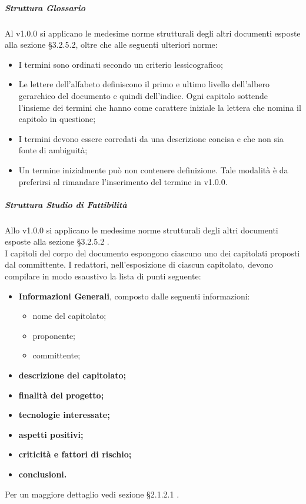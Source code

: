                 \subparagraph{Struttura Glossario}
                    Al  v1.0.0 si applicano le medesime norme strutturali degli altri documenti esposte alla sezione §3.2.5.2, oltre che alle seguenti ulteriori norme:\\
                    \begin{itemize}
                        \item I  termini sono ordinati secondo un criterio lessicografico; 
                        \item Le lettere dell'alfabeto definiscono il primo e ultimo livello dell’albero gerarchico del documento e quindi dell’indice. Ogni capitolo sottende l’insieme dei termini che hanno come carattere iniziale la lettera che nomina il capitolo in questione; 
                        \item I termini devono essere corredati da una descrizione concisa e che non sia fonte di ambiguità; 
                        \item Un termine inizialmente può non contenere definizione. Tale modalità è da preferirsi al rimandare l’inserimento del termine in  v1.0.0.
                    \end{itemize}
                \subparagraph{Struttura Studio di Fattibilità}
                    Allo  v1.0.0 si applicano le medesime norme strutturali degli altri documenti esposte alla sezione §3.2.5.2 . \\
                    I capitoli del corpo del documento espongono ciascuno uno dei capitolati proposti dal committente. I redattori, nell’esposizione di ciascun capitolato, devono compilare in modo esaustivo la lista di punti seguente: 
                    \begin{itemize}
                        \item\textbf{Informazioni Generali}, composto dalle seguenti informazioni:
                            \begin{itemize}
                                \item nome del capitolato;
                                \item proponente;
                                \item committente;
                            \end{itemize}
                        \item\textbf{descrizione del capitolato;}
                        \item\textbf{finalità del progetto;}
                        \item\textbf{tecnologie interessate;}
                        \item\textbf{aspetti positivi;}
                        \item\textbf{criticità e fattori di rischio;}
                        \item\textbf{conclusioni.}
                    \end{itemize}
                    Per un maggiore dettaglio vedi sezione §2.1.2.1 .
